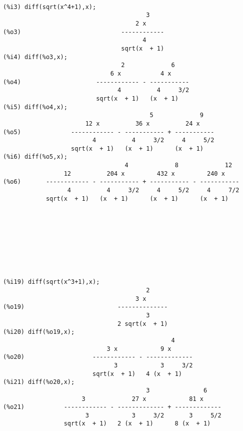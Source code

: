 

\vfill\eject
{\small\begin{verbatim}

(%i3) diff(sqrt(x^4+1),x);
                                        3
                                     2 x
(%o3)                            ------------
                                       4
                                 sqrt(x  + 1)
(%i4) diff(%o3,x);
                                 2             6
                              6 x           4 x
(%o4)                     ------------ - -----------
                                4          4     3/2
                          sqrt(x  + 1)   (x  + 1)
(%i5) diff(%o4,x);
                                         5             9
                       12 x          36 x          24 x
(%o5)              ------------ - ----------- + -----------
                         4          4     3/2     4     5/2
                   sqrt(x  + 1)   (x  + 1)      (x  + 1)
(%i6) diff(%o5,x);
                                  4             8             12
                 12          204 x         432 x         240 x
(%o6)       ------------ - ----------- + ----------- - -----------
                  4          4     3/2     4     5/2     4     7/2
            sqrt(x  + 1)   (x  + 1)      (x  + 1)      (x  + 1)









(%i19) diff(sqrt(x^3+1),x);
                                        2
                                     3 x
(%o19)                          --------------
                                        3
                                2 sqrt(x  + 1)
(%i20) diff(%o19,x);
                                               4
                             3 x            9 x
(%o20)                   ------------ - -------------
                               3            3     3/2
                         sqrt(x  + 1)   4 (x  + 1)
(%i21) diff(%o20,x);
                                        3               6
                      3             27 x            81 x
(%o21)           ------------ - ------------- + -------------
                       3            3     3/2       3     5/2
                 sqrt(x  + 1)   2 (x  + 1)      8 (x  + 1)


\end{verbatim}}

\vfill\eject


